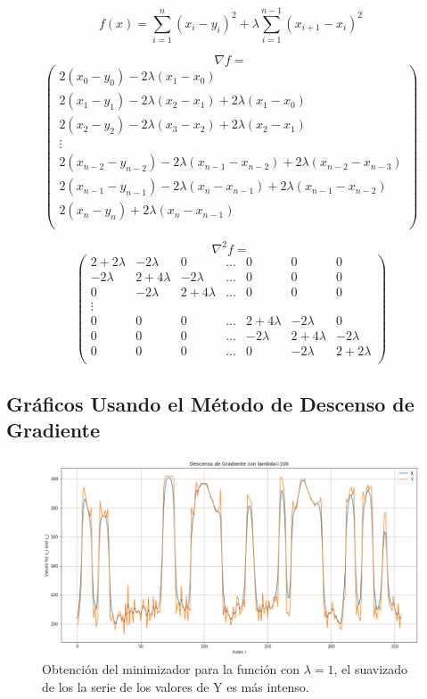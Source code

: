 \documentclass[conference]{IEEEtran}
\begin{document}
$$
f(x) = \sum_{i=1}^{n} (x_i-y_i)^2 + \lambda \sum_{i=1}^{n-1} (x_{i+1} - x_i)^2
$$

$$\nabla f = $$
$$
\begin{pmatrix}
	2(x_0-y_0) - 2\lambda(x_1-x_0) \\
	2(x_1-y_1) - 2\lambda(x_2-x_1) + 2\lambda (x_1 - x_0) \\
	2(x_2-y_2) - 2\lambda(x_3-x_2) + 2\lambda (x_2 - x_1) \\
	\vdots \\
	2(x_{n-2}-y_{n-2}) - 2\lambda(x_{n-1}-x_{n-2}) + 2\lambda (x_{n-2} - x_{n-3}) \\
	2(x_{n-1}-y_{n-1}) - 2\lambda(x_{n}-x_{n-1}) + 2\lambda (x_{n-1} - x_{n-2}) \\
	2(x_{n}-y_{n}) + 2\lambda (x_{n} - x_{n-1}) \\
\end{pmatrix}
$$

$$\nabla^2 f =$$
$$
\begin{pmatrix}
	2+2\lambda & -2\lambda & 0 & \dots & 0 & 0 & 0 \\
	-2\lambda & 2+4\lambda & -2\lambda & \dots & 0 & 0 & 0 \\
	0 & -2\lambda & 2+4\lambda & \dots & 0 & 0 & 0 \\
	\vdots \\
	0 & 0 & 0 & \dots & 2+4\lambda & -2\lambda & 0 \\
	0 & 0 & 0 & \dots & -2\lambda & 2+4\lambda & -2\lambda \\
	0 & 0 & 0 & \dots & 0 & -2\lambda & 2+2\lambda \\
\end{pmatrix}
$$

\subsection{Gráficos Usando el Método de Descenso de Gradiente}

\begin{figure}[htbp]
	\centerline{\includegraphics[scale=0.26]{dl1.png}}
	\caption{Obtención del minimizador para la función con $\lambda=1$, el suavizado de los la serie de los valores de Y es más intenso.}
	\label{figdl1}
\end{figure}
\end{document}
